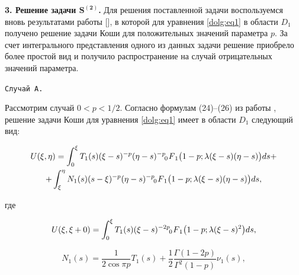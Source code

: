 \smallskip



\textbf{3. Решение задачи $\boldsymbol{S^{(2)}}$.} Для решения поставленной задачи воспользуемся вновь результатами работы [], в которой для уравнения \eqref{dolg:eq1} в области $D_1$ получено решение задачи Коши для положительных значений  параметра $p$. За счет интегрального представления одного из данных задачи  решение приобрело более простой вид и получило распространение на случай отрицательных значений параметра.



\smallskip



\texttt{Случай А.}

Рассмотрим случай $0<p<{1}/{2}$. Согласно формулам (24)--(26) из работы \cite[с.~586]{dolg:10}, решение задачи Коши для уравнения \eqref{dolg:eq1} имеет в области $D_1$ следующий вид:

\begin{multline}

U(\xi,\eta) = \int _0^\xi T_1(s) (\xi-s)^{-p} (\eta-s)^{-p}  \,\,

F_{\hspace{-4mm}0 \hspace{3mm}1} \bigl(1-p;\lambda (\xi-s) (\eta-s)\bigr) ds +

\\

\label{dolg:eq23}

+\int _\xi^\eta N_1(s) (s-\xi)^{-p} (\eta-s)^{-p}  \,\,

F_{\hspace{-4mm}0 \hspace{3mm}1} \bigl(1-p;\lambda (\xi-s) (\eta-s)\bigr) ds,

\end{multline}

где

\begin{equation}\label{dolg:eq24}

U(\xi,\xi+0) = \int _0^\xi T_1(s) (\xi-s)^{-2p}   \,\,

F_{\hspace{-4mm}0 \hspace{3mm}1} \bigl(1-p;\lambda (\xi-s)^2\bigr) ds,

\end{equation}

\begin{equation}\label{dolg:eq25}

N_1(s) = \frac{1}{2\cos\pi p} T_1(s) + \frac{1}{2} \frac{\Gamma(1-2p)}{\Gamma^2(1-p)} \nu_1(s),

\end{equation}

